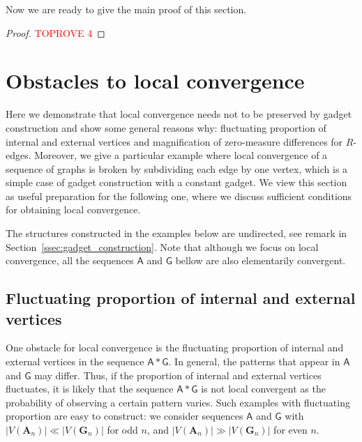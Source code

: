 \documentclass[11pt]{article}
\theoremstyle{plain}
\theoremstyle{definition}
\theoremstyle{remark}
\newcommand{\str}[1]{\mathbf{#1}}
\newcommand{\strseq}[1]{{\boldsymbol{\mathsf{#1}}}}
\begin{document}
Now we are ready to give the main proof of this section.

\begin{proof}\textcolor{red}{TOPROVE 4}\end{proof} \section{Obstacles to local convergence}\label{sec:obstacles}

Here we demonstrate that local convergence needs not to be preserved by gadget construction and show some general reasons why: fluctuating proportion of internal and external vertices and magnification of zero-measure differences for $R$-edges.
Moreover, we give a particular example where local convergence of a sequence of graphs is broken by subdividing each edge by one vertex, which is a simple case of gadget construction with a constant gadget.
We view this section as useful preparation for the following one, where we discuss sufficient conditions for obtaining local convergence.

The structures constructed in the examples below are undirected, see remark in Section~\ref{ssec:gadget_construction}.
Note that although we focus on local convergence, all the sequences $\strseq{A}$ and $\strseq{G}$ bellow are also elementarily convergent.

\subsection{Fluctuating proportion of internal and external vertices}\label{ssec:fluctuating_proportion_of_internal_and_external_vertices}

One obstacle for local convergence is the fluctuating proportion of internal and external vertices in the sequence $\strseq{A}*\strseq{G}$.
In general, the patterns that appear in $\strseq{A}$ and $\strseq{G}$ may differ.
Thus, if the proportion of internal and external vertices fluctuates, it is likely that the sequence $\strseq{A}*\strseq{G}$ is not local convergent as the probability of observing a certain pattern varies.
Such examples with fluctuating proportion are easy to construct: we consider sequences $\strseq{A}$ and $\strseq{G}$ with $|V(\str{A}_n)| \ll |V(\str{G}_n)|$ for odd $n$, and $|V(\str{A}_n)| \gg |V(\str{G}_n)|$ for even $n$.
\end{document}
